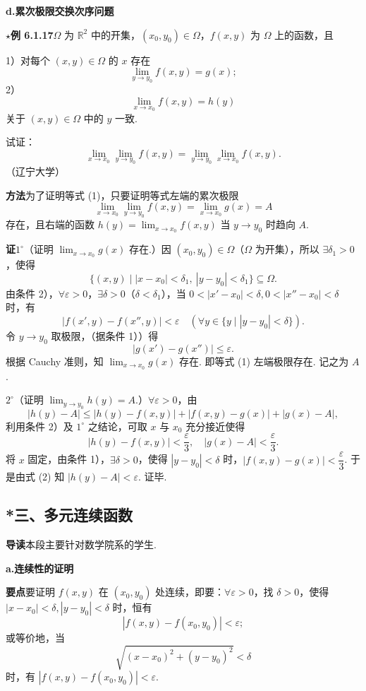 \documentclass[UTF8, 12pt, fontset=fandol, oneside]{ctexart}
\begin{document}
\noindent\textbf{d.\quad 累次极限交换次序问题}

\noindent\textbf{$\star$例 6.1.17}\quad $\Omega$ 为 $\mathbb{R}^2$ 中的开集，$(x_0,y_0)\in\Omega$，$f(x,y)$ 为 $\Omega$ 上的函数，且

1）对每个 $(x,y)\in\Omega$ 的 $x$ 存在
\[
  \lim_{y\to y_0}f(x,y)=g(x);
\]
2）
\[
  \lim_{x\to x_0}f(x,y)=h(y)
\]
关于 $(x,y)\in\Omega$ 中的 $y$ 一致.

试证：
\[
  \lim_{x\to x_0}\lim_{y\to y_0}f(x,y)
  =\lim_{y\to y_0}\lim_{x\to x_0}f(x,y).
\tag{1}
\]
（辽宁大学）

\noindent\textbf{方法}\quad 为了证明等式 (1)，只要证明等式左端的累次极限
\[
  \lim_{x\to x_0}\lim_{y\to y_0}f(x,y)=\lim_{x\to x_0}g(x)=A
\]
存在，且右端的函数 $h(y)=\displaystyle\lim_{x\to x_0}f(x,y)$ 当 $y\to y_0$ 时趋向 $A$.

\noindent\textbf{证}\quad $1^\circ$（证明 $\displaystyle\lim_{x\to x_0}g(x)$ 存在.）因 $(x_0,y_0)\in\Omega$（$\Omega$ 为开集），所以 $\exists\delta_1>0$，使得
\[
  \{(x,y)\mid |x-x_0|<\delta_1,\ |y-y_0|<\delta_1\}\subseteq\Omega.
\]
由条件 2），$\forall\varepsilon>0$，$\exists\delta>0$（$\delta<\delta_1$），当 $0<|x'-x_0|<\delta,0<|x''-x_0|<\delta$ 时，有
\[
  |f(x',y)-f(x'',y)|<\varepsilon
  \quad(\forall y\in\{y\mid |y-y_0|<\delta\}).
\]
令 $y\to y_0$ 取极限，（据条件 1））得
\[
  |g(x')-g(x'')|\le\varepsilon.
\]
根据 Cauchy 准则，知 $\displaystyle\lim_{x\to x_0}g(x)$ 存在. 即等式 (1) 左端极限存在. 记之为 $A$.

$2^\circ$（证明 $\displaystyle\lim_{y\to y_0}h(y)=A$.）$\forall\varepsilon>0$，由
\[
  |h(y)-A|\le |h(y)-f(x,y)|+|f(x,y)-g(x)|+|g(x)-A|, \tag{2}
\]
利用条件 2）及 $1^\circ$ 之结论，可取 $x$ 与 $x_0$ 充分接近使得
\[
  |h(y)-f(x,y)|<\frac{\varepsilon}{3},\quad
  |g(x)-A|<\frac{\varepsilon}{3}.
\]
将 $x$ 固定，由条件 1），$\exists\delta>0$，使得 $|y-y_0|<\delta$ 时，$|f(x,y)-g(x)|<\dfrac{\varepsilon}{3}$. 于是由式 (2) 知 $|h(y)-A|<\varepsilon$. 证毕.

\subsection*{*三、多元连续函数}

\noindent\textbf{导读}\quad 本段主要针对数学院系的学生.

\noindent\textbf{a.\quad 连续性的证明}

\noindent\textbf{要点}\quad 要证明 $f(x,y)$ 在 $(x_0,y_0)$ 处连续，即要：$\forall\varepsilon>0$，找 $\delta>0$，使得 $|x-x_0|<\delta,|y-y_0|<\delta$ 时，恒有
\[
  |f(x,y)-f(x_0,y_0)|<\varepsilon;
\]
或等价地，当
\[
  \sqrt{(x-x_0)^2+(y-y_0)^2}<\delta
\]
时，有 $|f(x,y)-f(x_0,y_0)|<\varepsilon$.
\end{document}
